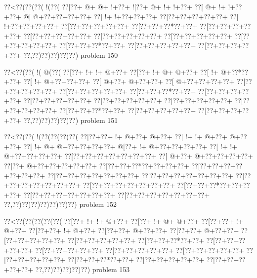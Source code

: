 \vbox{\vbox{\goo
\0??<\0??(\0??(\0??(\- !(\0??(
\0??[\0??+\- @+\- @+\- !+\0??+
\- ![\0??+\- @+\- !+\- !+\0??+
\0??[\- @+\- !+\- !+\0??+\0??+
\- @[\- @+\0??+\0??+\0??+\0??+
\0??[\- !+\- !+\0??+\0??+\0??+
\0??[\0??+\0??+\0??+\0??+\0??+
\0??[\- !+\0??+\0??+\0??+\0??+
\0??[\0??+\0??+\0??+\0??+\0??+
\0??[\0??+\0??+\0??*\0??+\0??+
\0??[\0??+\0??+\0??+\0??+\0??+
\0??[\0??+\0??+\0??+\0??+\0??+
\0??[\0??+\0??+\0??+\0??+\0??+
\0??[\0??+\0??+\0??+\0??+\0??+
\0??[\0??+\0??+\0??+\0??+\0??+
\0??[\0??+\0??+\0??*\0??+\0??+
\0??[\0??+\0??+\0??+\0??+\0??+
\0??[\0??+\0??+\0??+\0??+\0??+
\0??,\0??)\0??)\0??)\0??)\0??)
}
\hfil problem 150\hfil\break
}

\vbox{\vbox{\goo
\0??<\0??(\0??(\- !(\- @(\0??(
\0??[\0??+\- !+\- !+\- @+\0??+
\0??[\0??+\- !+\- @+\- @+\0??+
\0??[\- !+\- @+\0??*\0??+\0??+
\0??[\- !+\- @+\0??+\0??+\0??+
\0??[\- @+\0??+\- @+\0??+\0??+
\0??[\- @+\0??+\0??+\0??+\0??+
\0??[\0??+\0??+\0??+\0??+\0??+
\0??[\0??+\0??+\0??+\0??+\0??+
\0??[\0??+\0??+\0??*\0??+\0??+
\0??[\0??+\0??+\0??+\0??+\0??+
\0??[\0??+\0??+\0??+\0??+\0??+
\0??[\0??+\0??+\0??+\0??+\0??+
\0??[\0??+\0??+\0??+\0??+\0??+
\0??[\0??+\0??+\0??+\0??+\0??+
\0??[\0??+\0??+\0??*\0??+\0??+
\0??[\0??+\0??+\0??+\0??+\0??+
\0??[\0??+\0??+\0??+\0??+\0??+
\0??,\0??)\0??)\0??)\0??)\0??)
}
\hfil problem 151\hfil\break
}

\vbox{\vbox{\goo
\0??<\0??(\0??(\- !(\0??(\0??(\0??(\0??(
\0??[\0??+\0??+\- !+\- @+\0??+\- @+\0??+
\0??[\- !+\- !+\- @+\0??+\- @+\0??+\0??+
\0??[\- !+\- @+\- @+\0??+\0??+\0??+\0??+
\- @[\0??+\- !+\- @+\0??+\0??+\0??+\0??+
\0??[\- !+\- !+\- @+\0??+\0??+\0??+\0??+
\0??[\0??+\0??+\0??+\0??+\0??+\0??+\0??+
\0??[\- @+\0??+\- @+\0??+\0??+\0??+\0??+
\0??[\0??+\- @+\0??+\0??+\0??+\0??+\0??+
\0??[\0??+\0??+\0??*\0??+\0??+\0??+\0??+
\0??[\0??+\0??+\0??+\0??+\0??+\0??+\0??+
\0??[\0??+\0??+\0??+\0??+\0??+\0??+\0??+
\0??[\0??+\0??+\0??+\0??+\0??+\0??+\0??+
\0??[\0??+\0??+\0??+\0??+\0??+\0??+\0??+
\0??[\0??+\0??+\0??+\0??+\0??+\0??+\0??+
\0??[\0??+\0??+\0??*\0??+\0??+\0??+\0??+
\0??[\0??+\0??+\0??+\0??+\0??+\0??+\0??+
\0??[\0??+\0??+\0??+\0??+\0??+\0??+\0??+
\0??,\0??)\0??)\0??)\0??)\0??)\0??)\0??)
}
\hfil problem 152\hfil\break
}

\vbox{\vbox{\goo
\0??<\0??(\0??(\0??(\0??(\0??(
\0??[\0??+\- !+\- !+\- @+\0??+
\0??[\0??+\- !+\- @+\- @+\0??+
\0??[\0??+\0??+\- !+\- @+\0??+
\0??[\0??+\0??+\- !+\- @+\0??+
\0??[\0??+\0??+\- @+\0??+\0??+
\0??[\0??+\0??+\- @+\0??+\0??+
\0??[\0??+\0??+\0??+\0??+\0??+
\0??[\0??+\0??+\0??+\0??+\0??+
\0??[\0??+\0??+\0??*\0??+\0??+
\0??[\0??+\0??+\0??+\0??+\0??+
\0??[\0??+\0??+\0??+\0??+\0??+
\0??[\0??+\0??+\0??+\0??+\0??+
\0??[\0??+\0??+\0??+\0??+\0??+
\0??[\0??+\0??+\0??+\0??+\0??+
\0??[\0??+\0??+\0??*\0??+\0??+
\0??[\0??+\0??+\0??+\0??+\0??+
\0??[\0??+\0??+\0??+\0??+\0??+
\0??,\0??)\0??)\0??)\0??)\0??)
}
\hfil problem 153\hfil\break
}

